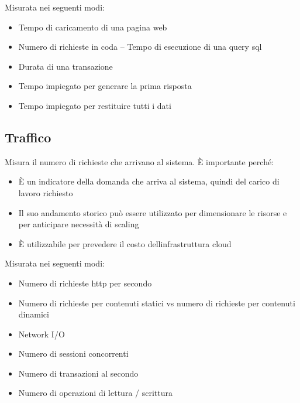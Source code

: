\documentclass[
]{article}
\providecommand{\tightlist}{%
  \setlength{\itemsep}{0pt}\setlength{\parskip}{0pt}}
\begin{document}
{}

{Misurata nei seguenti modi:}

\begin{itemize}
\tightlist
\item
  {Tempo di caricamento di una pagina web }
\item
  {Numero di richieste in coda -- Tempo di esecuzione di una query sql }
\item
  {Durata di una transazione }
\item
  {Tempo impiegato per generare la prima risposta }
\item
  {Tempo impiegato per restituire tutti i dati}
\end{itemize}

{}

\subsection{\texorpdfstring{{Traffico}}{Traffico}}\label{h.uza8ylshn9nf}

{Misura il numero di richieste che arrivano al sistema. È importante
perché:}

\begin{itemize}
\tightlist
\item
  {È un indicatore della domanda che arriva al sistema, quindi del
  carico di lavoro richiesto }
\item
  {Il suo andamento storico può essere utilizzato per dimensionare le
  risorse e per anticipare necessità di scaling }
\item
  {È utilizzabile per prevedere il costo
  dell\textquotesingle infrastruttura cloud}
\end{itemize}

{}

{Misurata nei seguenti modi:}

\begin{itemize}
\tightlist
\item
  {Numero di richieste http per secondo }
\item
  {Numero di richieste per contenuti statici vs numero di richieste per
  contenuti dinamici }
\item
  {Network I/O }
\item
  {Numero di sessioni concorrenti }
\item
  {Numero di transazioni al secondo }
\item
  {Numero di operazioni di lettura / scrittura}
\end{itemize}
\end{document}

